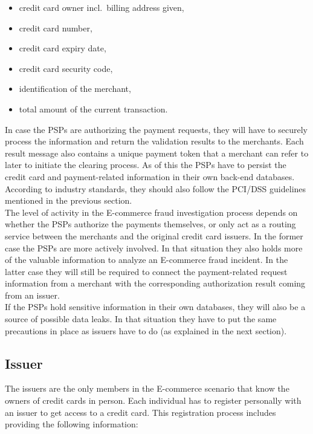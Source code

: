 \begin{itemize}
		\item credit card owner incl.\ billing address given,
		\item credit card number,
		\item credit card expiry date,
		\item credit card security code,
		\item identification of the merchant,
		\item total amount of the current transaction.
\end{itemize}

In case the \gls{PSP}s are authorizing the payment requests, they will have to securely process the information and return the validation results to the merchants. Each result message also contains a unique payment token that a merchant can refer to later to initiate the clearing process. As of this the \gls{PSP}s have to persist the credit card and payment-related information in their own back-end databases. According to industry standards, they should also follow the \gls{PCI/DSS} guidelines mentioned in the previous section. \\

The level of activity in the \gls{E-commerce} fraud investigation process depends on whether the \gls{PSP}s authorize the payments themselves, or only act as a routing service between the merchants and the original credit card issuers. In the former case the \gls{PSP}s are more actively involved. In that situation they also holds more of the valuable information to analyze an \gls{E-commerce} fraud incident. In the latter case they will still be required to connect the payment-related request information from a merchant with the corresponding authorization result coming from an issuer. \\

If the \gls{PSP}s hold sensitive information in their own databases, they will also be a source of possible data leaks. In that situation they have to put the same precautions in place as issuers have to do (as explained in the next section).


\subsection{Issuer}
\label{subsec:stakeholder_issuer}

The issuers are the only members in the \gls{E-commerce} scenario that know the owners of credit cards in person. Each individual has to register personally with an issuer to get access to a credit card. This registration process includes providing the following information: \@


